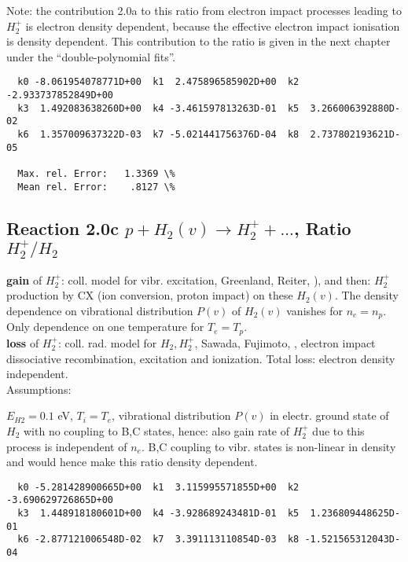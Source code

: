 \documentclass[12pt,dvipdfmx]{article}
\begin{document}
{Note: the contribution 2.0a to this ratio from electron impact processes leading to $H_2^+$ is electron density dependent,
because the effective electron impact ionisation is density dependent.
This contribution to the ratio is given in the next chapter under the ``double-polynomial fits''.
\medskip


\begin{small}\begin{verbatim}
  k0 -8.061954078771D+00  k1  2.475896585902D+00  k2 -2.933737852849D+00
  k3  1.492083638260D+00  k4 -3.461597813263D-01  k5  3.266006392880D-02
  k6  1.357009637322D-03  k7 -5.021441756376D-04  k8  2.737802193621D-05

  Max. rel. Error:   1.3369 \%
  Mean rel. Error:    .8127 \%

\end{verbatim}\end{small}

\subsection{
Reaction 2.0c   $p + H_2(v) \rightarrow H_2^+ + ... $, Ratio  \ $H_2^+/H_2$
}
\textbf{gain }of $H_2^+$: coll. model for vibr. excitation, Greenland, Reiter, \cite{kn:Green}),
and then: $H_2^+$ production by CX (ion conversion, proton impact) on these $H_2(v)$.
The density dependence on vibrational distribution $P(v)$ of $H_2(v)$ vanishes for $n_e=n_p$.
Only dependence on one temperature for $T_e=T_p$.
\\
\textbf{loss }of $H_2^+$: coll. rad. model for $H_2, H_2^+$, Sawada, Fujimoto, \cite{kn:Sawada},
electron impact dissociative recombination, excitation and ionization. Total loss: electron density independent.\\


Assumptions:

$E_{H2} = 0.1$ eV, $T_i = T_e$, vibrational distribution $P(v)$ in electr. ground state of $H_2$ with
no coupling to B,C states,
hence: also gain rate of $H_2^+$ due to this process is independent of $n_e$.
B,C coupling to vibr. states is non-linear in density and would hence make this ratio density dependent.

\begin{small}\begin{verbatim}
  k0 -5.281428900665D+00  k1  3.115995571855D+00  k2 -3.690629726865D+00
  k3  1.448918180601D+00  k4 -3.928689243481D-01  k5  1.236809448625D-01
  k6 -2.877121006548D-02  k7  3.391113110854D-03  k8 -1.521565312043D-04


\end{verbatim}
\end{small}}
\end{document}
